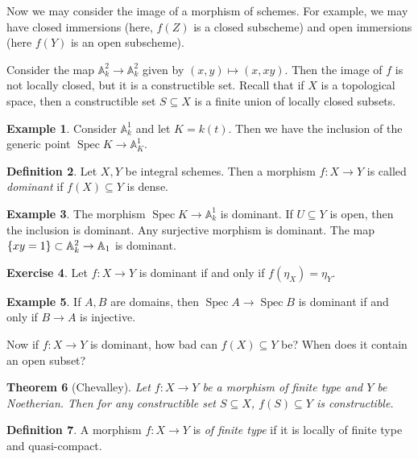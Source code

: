 \documentclass[leqno, openany]{memoir}
\newtheorem{thm}{Theorem}[section]
\theoremstyle{definition}
\newtheorem{defn}[thm]{Definition}
\newtheorem{exm}[thm]{Example}
\newtheorem{exer}[thm]{Exercise}
\theoremstyle{remark}
\theoremstyle{plain}
\theoremstyle{definition}
\theoremstyle{remark}
\newcommand{\A}{\mathbb{A}}
\DeclareMathOperator{\Spec}{Spec}
\begin{document}
Now we may consider the image of a morphism of schemes. For example, we may
have closed immersions (here, $f(Z)$ is a closed subscheme) and open immersions
(here $f(Y)$ is an open subscheme).

Consider the map $\A^2_k \to \A^2_k$ given by $(x,y) \mapsto (x, xy)$. Then the
image of $f$ is not locally closed, but it is a constructible set. Recall that
if $X$ is a topological space, then a constructible set $S \subseteq X$ is a
finite union of locally closed subsets.

\begin{exm} Consider $\A^1_k$ and let $K = k(t)$. Then we have the inclusion of
the generic point $\Spec K \to \A^1_K$.  \end{exm}

\begin{defn} Let $X,Y$ be integral schemes. Then a morphism $f \colon X \to Y$
is called \textit{dominant} if $f(X) \subseteq Y$ is dense.  \end{defn}

\begin{exm} The morphism $\Spec K \to \A^1_k$ is dominant. If $U \subseteq Y$
is open, then the inclusion is dominant. Any surjective morphism is dominant.
The map $\qty{xy = 1} \subset \A^2_k \to \A_1$ is dominant.  \end{exm}

\begin{exer} Let $f \colon X \to Y$ is dominant if and only if $f(\eta_X) =
\eta_Y$.  \end{exer}

\begin{exm} If $A, B$ are domains, then $\Spec A \to \Spec B$ is dominant if
and only if $B \to A$ is injective.  \end{exm}

Now if $f \colon X \to Y$ is dominant, how bad can $f(X) \subseteq Y$ be? When
does it contain an open subset?

\begin{thm}[Chevalley] Let $f \colon X \to Y$ be a morphism of finite type and
$Y$ be Noetherian. Then for any constructible set $S \subseteq X$, $f(S)
\subseteq Y$ is constructible.  \end{thm}

\begin{defn} A morphism $f \colon X \to Y$ is \textit{of finite type} if it is
locally of finite type and quasi-compact.  \end{defn}
\end{document}
